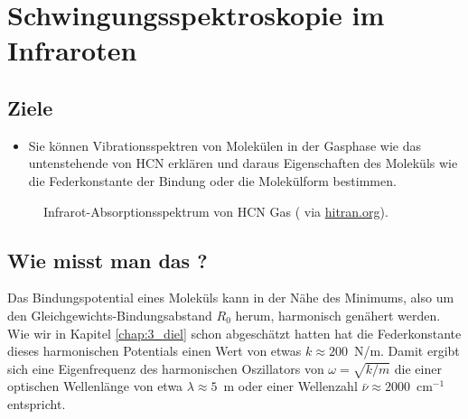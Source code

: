 
\chapter{Schwingungsspektroskopie im Infraroten}

\label{chap:vib}


\section{Ziele}

\begin{itemize}
\item Sie können Vibrationsspektren von Molekülen in der Gasphase wie das untenstehende von HCN erklären und daraus Eigenschaften des Moleküls wie die  Federkonstante der Bindung oder die  Molekülform bestimmen.
\end{itemize}


\begin{figure}
\caption{Infrarot-Absorptionsspektrum von HCN Gas  (\cite{Maki_1995_HCN} via \href{https://hitran.org}{hitran.org}).
\label{fig:vib_hcn}}
\end{figure}



\section{Wie misst man das ?}

Das Bindungspotential eines Moleküls kann in der Nähe des Minimums, also um den Gleichgewichts-Bindungsabstand $R_0$ herum, harmonisch genähert werden.
Wie wir in Kapitel \ref{chap:3_diel} schon abgeschätzt hatten hat die Federkonstante dieses harmonischen Potentials einen Wert von etwas $k \approx 200$~N/m. Damit ergibt sich eine Eigenfrequenz des harmonischen Oszillators von $\omega = \sqrt{k / m}$ die einer optischen Wellenlänge von etwa $\lambda \approx 5$~\textmu m oder einer Wellenzahl $\bar{\nu} \approx 2000$~cm$^{-1}$ entspricht. 

